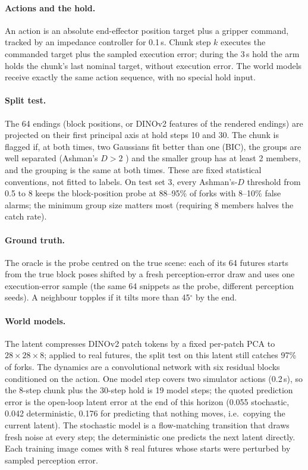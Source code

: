 \documentclass{article}
\begin{document}
\paragraph{Actions and the hold.} An action is an absolute end-effector position target plus a gripper
command, tracked by an impedance controller for 0.1\,s. Chunk step $k$ executes the commanded target plus
the sampled execution error; during the 3\,s hold the arm holds the chunk's last nominal target, without
execution error. The world models receive exactly the same action sequence, with no special hold input.

\paragraph{Split test.} The 64 endings (block positions, or DINOv2 features of the rendered endings) are
projected on their first principal axis at hold steps 10 and 30. The chunk is flagged if, at both times,
two Gaussians fit better than one (BIC), the groups are well separated (Ashman's $D>2$
\citep{ashman1994detecting}) and the smaller group has at least 2 members, and the grouping is the same
at both times. These are fixed statistical conventions, not fitted to labels. On test set 3, every
Ashman's-$D$ threshold from 0.5 to 8 keeps the block-position probe at 88--95\% of forks with 8--10\%
false alarms; the minimum group size matters most (requiring 8 members halves the catch rate).

\paragraph{Ground truth.} The oracle is the probe centred on the true scene: each of its 64 futures starts
from the true block poses shifted by a fresh perception-error draw and uses one execution-error sample (the
same 64 snippets as the probe, different perception seeds). A neighbour topples if it tilts more than
45$^\circ$ by the end.

\paragraph{World models.} The latent compresses DINOv2 patch tokens by a fixed per-patch PCA to
$28\times28\times8$; applied to real futures, the split test on this latent still catches 97\% of forks.
The dynamics are a convolutional network with six residual blocks conditioned on the action. One model
step covers two simulator actions (0.2\,s), so the 8-step chunk plus the 30-step hold is 19 model steps;
the quoted prediction error is the open-loop latent error at the end of this horizon (0.055 stochastic,
0.042 deterministic, 0.176 for predicting that nothing moves, i.e.\ copying the current latent). The stochastic model is a flow-matching transition
that draws fresh noise at every step; the deterministic one predicts the next latent directly. Each
training image comes with 8 real futures whose starts were perturbed by sampled perception error.
\end{document}
